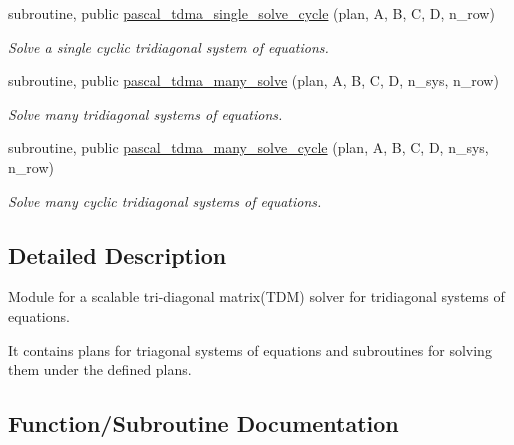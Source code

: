 \begin{DoxyCompactItemize}
subroutine, public \mbox{\hyperlink{namespacepascal__tdma_ac8e377fa86c75126380f0196f6046043}{pascal\+\_\+tdma\+\_\+single\+\_\+solve\+\_\+cycle}} (plan, A, B, C, D, n\+\_\+row)
\begin{DoxyCompactList}\small\item\em Solve a single cyclic tridiagonal system of equations. \end{DoxyCompactList}\item 
subroutine, public \mbox{\hyperlink{namespacepascal__tdma_afa0c78b8377f5fe1059907befda3c940}{pascal\+\_\+tdma\+\_\+many\+\_\+solve}} (plan, A, B, C, D, n\+\_\+sys, n\+\_\+row)
\begin{DoxyCompactList}\small\item\em Solve many tridiagonal systems of equations. \end{DoxyCompactList}\item 
subroutine, public \mbox{\hyperlink{namespacepascal__tdma_acbaed65e67ecbfd92a8f1d51d1b69fd5}{pascal\+\_\+tdma\+\_\+many\+\_\+solve\+\_\+cycle}} (plan, A, B, C, D, n\+\_\+sys, n\+\_\+row)
\begin{DoxyCompactList}\small\item\em Solve many cyclic tridiagonal systems of equations. \end{DoxyCompactList}\end{DoxyCompactItemize}


\subsection{Detailed Description}
Module for a scalable tri-\/diagonal matrix(\+T\+D\+M) solver for tridiagonal systems of equations. 

It contains plans for triagonal systems of equations and subroutines for solving them under the defined plans. 

\subsection{Function/\+Subroutine Documentation}
\mbox{\label{namespacepascal__tdma_afa0c78b8377f5fe1059907befda3c940}} 
